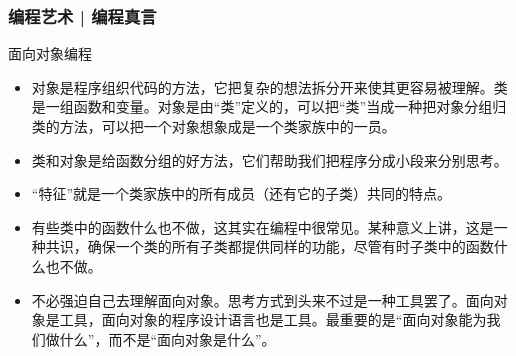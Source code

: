 \begin{frame}
  \frametitle{编程艺术 | 编程真言}
  \begin{block}{面向对象编程}
    \begin{itemize}
      \item \alert{对象是程序组织代码的方法}，它把复杂的想法拆分开来使其更容易被理解。\alert{类是一组函数和变量}。对象是由“类”定义的，可以把“类”当成一种把对象分组归类的方法，可以把一个对象想象成是一个类家族中的一员。
      \item 类和对象是给函数分组的好方法，它们帮助我们把程序分成小段来分别思考。
      \item “特征”就是一个类家族中的所有成员（还有它的子类）共同的特点。
      \item 有些类中的函数什么也不做，这其实在编程中很常见。某种意义上讲，这是一种共识，确保一个类的所有子类都提供同样的功能，尽管有时子类中的函数什么也不做。
      \item 不必强迫自己去理解面向对象。思考方式到头来不过是一种工具罢了。面向对象是工具，面向对象的程序设计语言也是工具。最重要的是“面向对象能为我们做什么”，而不是“面向对象是什么”。
    \end{itemize}
  \end{block}
\end{frame}


